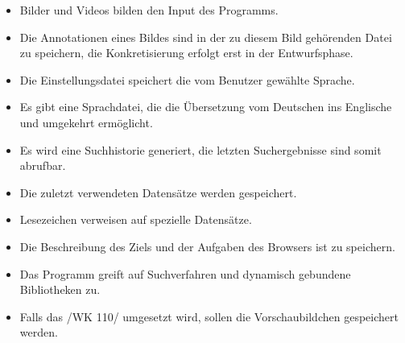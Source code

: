\begin{itemize}
	\item Bilder und Videos bilden den Input des Programms.
	\item Die Annotationen eines Bildes sind in der zu diesem Bild gehörenden Datei zu speichern, die Konkretisierung erfolgt erst 		in der Entwurfsphase.
	\item Die Einstellungsdatei speichert die vom Benutzer gewählte Sprache.
	\item Es gibt eine Sprachdatei, die die Übersetzung vom Deutschen ins Englische und umgekehrt ermöglicht.
	\item Es wird eine Suchhistorie generiert, die letzten Suchergebnisse sind somit abrufbar. 
	\item Die zuletzt verwendeten Datensätze werden gespeichert.
	\item Lesezeichen verweisen auf spezielle Datensätze.
	\item Die Beschreibung des Ziels und der Aufgaben des Browsers ist zu speichern.
	\item Das Programm greift auf Suchverfahren und dynamisch gebundene Bibliotheken zu.
	\item Falls das /WK 110/ umgesetzt wird, sollen die Vorschaubildchen gespeichert werden.
\end{itemize}
